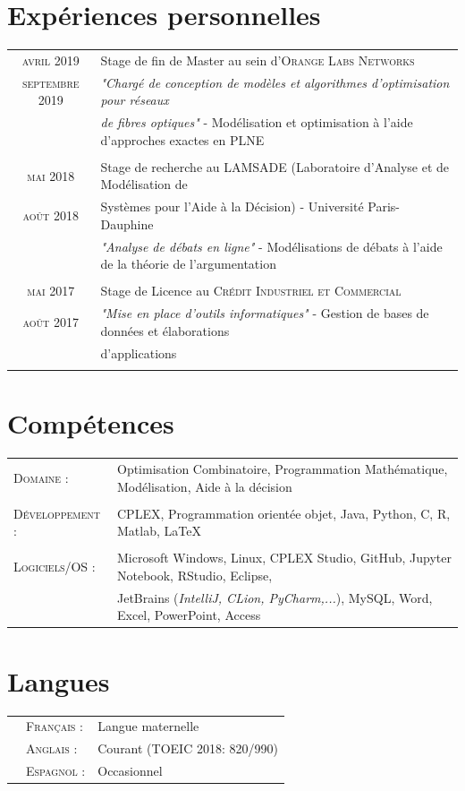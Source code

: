 \documentclass[a4paper,10pt]{article}
\begin{document}
\section{Expériences personnelles}
\begin{tabular}{c|l}	
 \textsc{avril} 2019 & Stage de fin de Master au sein d’\textsc{Orange Labs Networks} \\ 
 \textsc{septembre} 2019 & \emph{"Chargé de conception de modèles et algorithmes d'optimisation pour réseaux}\\
 & \emph{de fibres optiques"}\small{ - Modélisation et optimisation à l'aide d'approches exactes en PLNE}\\\multicolumn{2}{c}{} \\
 \textsc{mai} 2018 & Stage de recherche au \textsc{LAMSADE} (Laboratoire d'Analyse et de Modélisation de\\  \textsc{août} 2018 & Systèmes pour l'Aide à la Décision) - Université Paris-Dauphine\\
  & \emph{"Analyse de débats en ligne"}\small{ - Modélisations de débats à l'aide de la théorie de l'argumentation}\\\multicolumn{2}{c}{} \\
 \textsc{mai} 2017 & Stage de Licence au \textsc{Crédit Industriel et Commercial}\\
 \textsc{août} 2017 & \emph{"Mise en place d'outils informatiques"}\small{ - Gestion de bases de données et élaborations} \\ &  \small{d'applications}\\\multicolumn{2}{c}{}
 \end{tabular}

\section{Compétences}

\begin{tabular}{l p{15cm}}	
\textsc{Domaine :}    &   Optimisation Combinatoire, Programmation Mathématique, Modélisation, Aide à la décision\\&\\
\textsc{Développement :} & CPLEX, Programmation orientée objet, Java, Python, C, R, Matlab, \LaTeX \\&\\
\textsc{Logiciels/OS :}&  Microsoft Windows, Linux, CPLEX  Studio, GitHub, Jupyter Notebook, RStudio, Eclipse, \\
     &                    JetBrains (\emph{IntelliJ, CLion, PyCharm,...}), MySQL, Word, Excel, PowerPoint, Access
\end{tabular}


\section{Langues}
\begin{flushleft}
\begin{tabular}{p{0.05cm}ll}
&\textsc{Français :}&Langue maternelle\\
&\textsc{Anglais :}&Courant (TOEIC 2018: 820/990)\\
&\textsc{Espagnol :}&Occasionnel
\end{tabular}
\end{flushleft}
\end{document}
